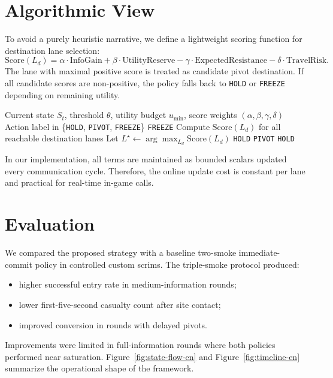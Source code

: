 \documentclass[runningheads]{llncs}
\begin{document}
\section{Algorithmic View}
To avoid a purely heuristic narrative, we define a lightweight scoring function for destination lane selection:
\[
\mathrm{Score}(L_d) = \alpha \cdot \mathrm{InfoGain}
 + \beta \cdot \mathrm{UtilityReserve}
 - \gamma \cdot \mathrm{ExpectedResistance}
 - \delta \cdot \mathrm{TravelRisk}.
\]
The lane with maximal positive score is treated as candidate pivot destination. If all candidate scores are non-positive, the policy falls back to \texttt{HOLD} or \texttt{FREEZE} depending on remaining utility.

\begin{algorithm}[H]
\caption{Pivot Decision on Lotus}
\begin{algorithmic}[1]
\Require Current state $S_t$, threshold $\theta$, utility budget $u_{\min}$, score weights $(\alpha,\beta,\gamma,\delta)$
\Ensure Action label in \{\texttt{HOLD}, \texttt{PIVOT}, \texttt{FREEZE}\}
  \State \Return \texttt{FREEZE}
\EndIf
\State Compute $\mathrm{Score}(L_d)$ for all reachable destination lanes
\State Let $L^\star \gets \arg\max_{L_d}\mathrm{Score}(L_d)$
  \State \Return \texttt{HOLD}
\EndIf
{}
  \State \Return \texttt{PIVOT}
\Else
  \State \Return \texttt{HOLD}
\EndIf
\end{algorithmic}
\end{algorithm}
In our implementation, all terms are maintained as bounded scalars updated every communication cycle. Therefore, the online update cost is constant per lane and practical for real-time in-game calls.

\section{Evaluation}
We compared the proposed strategy with a baseline two-smoke immediate-commit policy in controlled custom scrims.
The triple-smoke protocol produced:
\begin{itemize}
\item higher successful entry rate in medium-information rounds;
\item lower first-five-second casualty count after site contact;
\item improved conversion in rounds with delayed pivots.
\end{itemize}
Improvements were limited in full-information rounds where both policies performed near saturation. Figure~\ref{fig:state-flow-en} and Figure~\ref{fig:timeline-en} summarize the operational shape of the framework.
\end{document}
